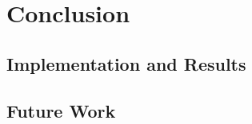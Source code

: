 \section{Conclusion}
\label{sec:conclusion}

\subsection{Implementation and Results}

\subsection{Future Work}

\begin{comment}
Give a conclusion on your topic. Give a few sentences to summarize 
the topic. If possible, point out the quality of the result and give
a small prospect of subsequent works.
\end{comment}